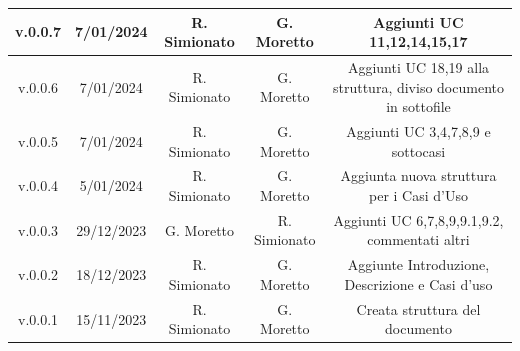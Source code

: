 \documentclass[5pt]{article}
\begin{document}
\begin{table}[ht]
{\begin{tabular}{|c|c|c|c|c|}
    \hline
    v.0.0.7 & 7/01/2024 & R. Simionato & G. Moretto & Aggiunti UC 11,12,14,15,17 \\
    \hline
    v.0.0.6 & 7/01/2024 & R. Simionato & G. Moretto & Aggiunti UC 18,19 alla struttura, diviso documento in sottofile \\
    \hline
    v.0.0.5 & 7/01/2024 & R. Simionato & G. Moretto & Aggiunti UC 3,4,7,8,9 e sottocasi  \\
    \hline
    v.0.0.4 & 5/01/2024 & R. Simionato & G. Moretto & Aggiunta nuova struttura per i Casi d'Uso \\
    \hline
    v.0.0.3 & 29/12/2023 & G. Moretto & R. Simionato  & Aggiunti UC 6,7,8,9,9.1,9.2, commentati altri \\
    \hline
    v.0.0.2 & 18/12/2023 & R. Simionato & G. Moretto & Aggiunte Introduzione, Descrizione e Casi d'uso \\
    \hline
    v.0.0.1 & 15/11/2023 & R. Simionato & G. Moretto  & Creata struttura del documento \\
    \hline
  \end{tabular}%
  }
  \label{tab:conference}
\end{table}



\pagebreak
\tableofcontents
\pagebreak









\end{document}

